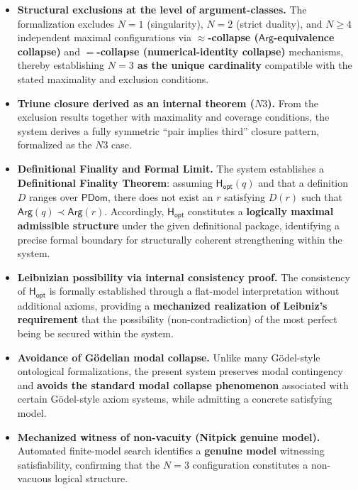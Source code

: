 \documentclass[a4paper, 11pt]{article}
\theoremstyle{plain}
\theoremstyle{definition}
\newcommand{\Arg}{\mathsf{Arg}}           %
\newcommand{\Hopt}{\mathsf{H_{opt}}}       %
\newcommand{\PDom}{\mathsf{PDom}}         %
\begin{document}
\begin{itemize}
  \item \textbf{Structural exclusions at the level of argument-classes.}
  The formalization excludes $N=1$ (singularity), $N=2$ (strict duality), and $N\ge 4$ independent maximal configurations via \textbf{$\approx$-collapse ($\Arg$-equivalence collapse)} and \textbf{$=$-collapse (numerical-identity collapse)} mechanisms, thereby establishing \textbf{$N=3$ as the unique cardinality} compatible with the stated maximality and exclusion conditions.

  \item \textbf{Triune closure derived as an internal theorem ($N3$).}
  From the exclusion results together with maximality and coverage conditions, the system derives a fully symmetric ``pair implies third'' closure pattern, formalized as the $N3$ case.

  \item \textbf{Definitional Finality and Formal Limit.}
  The system establishes a \textbf{Definitional Finality Theorem}: assuming $\Hopt(q)$ and that a definition $D$ ranges over $\PDom$, there does not exist an $r$ satisfying $D(r)$ such that $\Arg(q) \prec \Arg(r)$. Accordingly, $\Hopt$ constitutes a \textbf{logically maximal admissible structure} under the given definitional package, identifying a precise formal boundary for structurally coherent strengthening within the system.

  \item \textbf{Leibnizian possibility via internal consistency proof.}
  The consistency of $\Hopt$ is formally established through a flat-model interpretation without additional axioms, providing a \textbf{mechanized realization of Leibniz's requirement} that the possibility (non-contradiction) of the most perfect being be secured within the system.

  \item \textbf{Avoidance of G\"{o}delian modal collapse.}
  Unlike many G\"{o}del-style ontological formalizations, the present system preserves modal contingency and \textbf{avoids the standard modal collapse phenomenon} associated with certain G\"{o}del-style axiom systems, while admitting a concrete satisfying model.

  \item \textbf{Mechanized witness of non-vacuity (Nitpick genuine model).}
  Automated finite-model search identifies a \textbf{genuine model} witnessing satisfiability, confirming that the $N=3$ configuration constitutes a non-vacuous logical structure.


\end{itemize}
\end{document}
